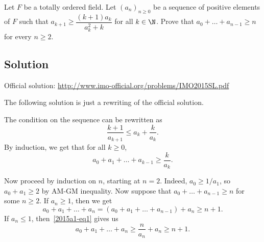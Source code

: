 Let $F$ be a totally ordered field.
Let $(a_n)_{n \geq 0}$ be a sequence of positive elements of $F$ such that $a_{k + 1} \geq \dfrac{(k + 1) a_k}{a_k^2 + k}$ for all $k \in \N$.
Prove that $a_0 + \ldots + a_{n - 1} \geq n$ for every $n \geq 2$.



\subsection*{Solution}

Official solution: \url{http://www.imo-official.org/problems/IMO2015SL.pdf}

The following solution is just a rewriting of the official solution.

The condition on the sequence can be rewritten as
\[ \frac{k + 1}{a_{k + 1}} \leq a_k + \frac{k}{a_k}. \]
By induction, we get that for all $k \geq 0$,
\[ a_0 + a_1 + \ldots + a_{k - 1} \geq \frac{k}{a_k}. \tag{1}\label{2015a1-eq1} \]

Now proceed by induction on $n$, starting at $n = 2$.
Indeed, $a_0 \geq 1/a_1$, so $a_0 + a_1 \geq 2$ by AM-GM inequality.
Now suppose that $a_0 + \ldots + a_{n - 1} \geq n$ for some $n \geq 2$.
If $a_n \geq 1$, then we get
\[ a_0 + a_1 + \ldots + a_n = (a_0 + a_1 + \ldots + a_{n - 1}) + a_n \geq n + 1. \]
If $a_n \leq 1$, then~\eqref{2015a1-eq1} gives us
\[ a_0 + a_1 + \ldots + a_n \geq \frac{n}{a_n} + a_n \geq n + 1. \]
